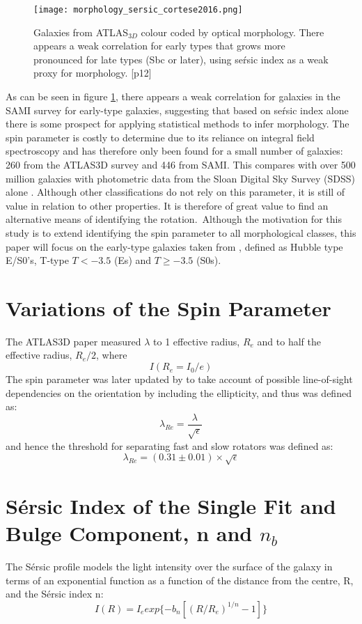 \begin{figure}[h]
	\caption{Galaxies from ATLAS$_{3D}$ colour coded by optical morphology. There appears a weak correlation for early types that grows more pronounced for late types (Sbc or later), using se\'rsic index as a weak proxy for morphology.	
		\cite{Cortese2016}[p12]}
	\centering
	\texttt{[image: morphology\_sersic\_cortese2016.png]}
	\label{fig:morphologysersic}
\end{figure}
As can be seen in figure \ref{fig:morphologysersic}, there appears a weak correlation for galaxies in the SAMI survey for early-type galaxies, suggesting that based on se\'rsic index alone there is some prospect for applying statistical methods to infer morphology.
The spin parameter is costly to determine due to its reliance on integral field spectroscopy and has therefore only been found for a small number of galaxies: 260 from the ATLAS3D survey and 446 from SAMI. This compares with over 500 million galaxies with photometric data from the Sloan Digital Sky Survey (SDSS) alone \cite{SDSS}. Although other classifications do not rely on this parameter, it is still of value in relation to other properties. It is therefore of great value to find an alternative means of identifying the rotation.\
Although the motivation for this study is to extend identifying the spin parameter to all morphological classes, this paper will focus on the early-type galaxies taken from \cite{Emsellem2011}, defined as Hubble type E/S0's, T-type $T < −3.5$ (Es) and $T \geq −3.5$ (S0s).
\section{Variations of the Spin Parameter}
The ATLAS3D paper measured $\lambda$ to 1 effective radius, $R_{e}$ and to half the effective radius, $R_{e}/2$, where 
\begin{equation}
I(R_{e}=I_{0}/e)
\end{equation}
The spin parameter was later updated by \cite{Cappellari2011} to take account of possible line-of-sight dependencies on the orientation by including the ellipticity, and thus was defined as:
\begin{equation}
\lambda_{Re} = \frac{\lambda}{\sqrt{\epsilon}}
\end{equation}
and hence the threshold for separating fast and slow rotators was defined as:
\begin{equation}
\lambda_{Re}=(0.31\pm0.01)\times \sqrt{\epsilon}
\end{equation}
\section{S\'ersic Index of the Single Fit and Bulge Component, n and $n_{b}$}
The S\'ersic profile models the light intensity over the surface of the galaxy in terms of an exponential function as a function of the distance from the centre, R, and the S\'ersic index n:
\begin{equation}
I(R) = I_{e} exp\{-b_{n} [(R/R_{e})^{1/n}-1]\}
\end{equation}
